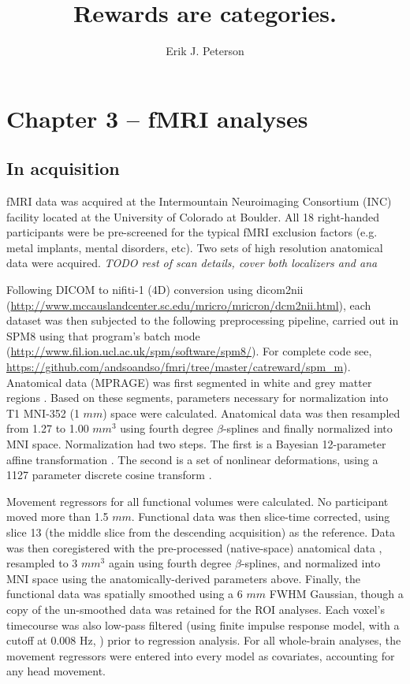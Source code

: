 \documentclass[doc,12pt]{apa}        %
\title{Rewards are categories.}
\author{Erik J. Peterson} \affiliation{Dept. of Psychology \\ Colorado State University \\ Fort Collins, CO}
\begin{document}
 
\maketitle
\doublespacing

\section{Chapter 3 -- fMRI analyses} %
\label{sec:task_and_models}
\subsection{In acquisition}
\label{sub:acquired}
fMRI data was acquired at the Intermountain Neuroimaging Consortium (INC) facility located at the University of Colorado at Boulder.  All 18 right-handed participants were be pre-screened for the typical fMRI exclusion factors (e.g. metal implants, mental disorders, etc).  Two sets of high resolution anatomical data were acquired. \emph{TODO rest of scan details, cover both localizers and ana}

Following DICOM to nifiti-1 (4D) conversion using dicom2nii (\url{http://www.mccauslandcenter.sc.edu/mricro/mricron/dcm2nii.html}), each dataset was then subjected to the following preprocessing pipeline, carried out in SPM8 using that program's batch mode (\url{http://www.fil.ion.ucl.ac.uk/spm/software/spm8/}).  For complete code see, \url{https://github.com/andsoandso/fmri/tree/master/catreward/spm\_m}).  Anatomical data (MPRAGE) was first segmented in white and grey matter regions \cite{Collignon:1995p9347}.  Based on these segments, parameters necessary for normalization into T1 MNI-352 (1 $mm$) space were calculated.  Anatomical data was then resampled from 1.27 to 1.00 $mm^3$ using fourth degree $\beta$-splines and finally normalized into MNI space.  Normalization had two steps.  The first is a Bayesian 12-parameter affine transformation \cite{Ashburner:1997p9348}.  The second is a set of nonlinear deformations, using a 1127 parameter discrete cosine transform \cite{Ashburner:1999p9350}. 

Movement regressors for all functional volumes were calculated.  No participant moved more than 1.5 $mm$. Functional data was then slice-time corrected, using slice 13 (the middle slice from the descending acquisition) as the reference. Data was then coregistered with the pre-processed (native-space) anatomical data \cite{Collignon:1995p9347}, resampled to 3 $mm^3$ again using fourth degree $\beta$-splines, and normalized into MNI space using the anatomically-derived parameters above.  Finally, the functional data was spatially smoothed using a 6 $mm$ FWHM Gaussian, though a copy of the un-smoothed data was retained for the ROI analyses.  Each voxel's timecourse was also low-pass filtered (using finite impulse response model, with a cutoff at 0.008 Hz, \cite{Kruggel:1999p9351}) prior to regression analysis.  For all whole-brain analyses, the movement regressors were entered into every model as covariates, accounting for any head movement.
\end{document}
